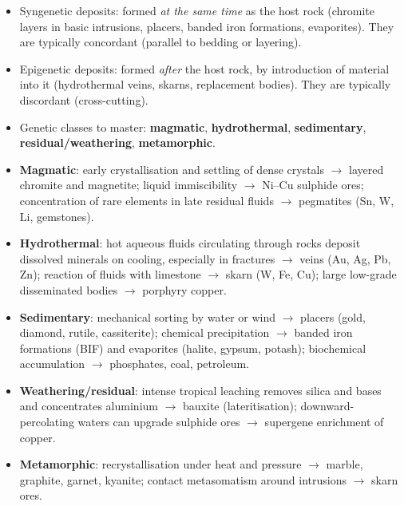 \documentclass[11pt]{article}
\newcommand{\cle}[1]{{\popxbold\color{popdark}#1}}
\begin{document}
\begin{aretenir}
\begin{itemize}
\item \cle{Syngenetic} deposits: formed \emph{at the same time} as the host rock (chromite layers in basic intrusions, placers, banded iron formations, evaporites). They are typically concordant (parallel to bedding or layering).
\item \cle{Epigenetic} deposits: formed \emph{after} the host rock, by introduction of material into it (hydrothermal veins, skarns, replacement bodies). They are typically discordant (cross-cutting).
\item Genetic classes to master: \textbf{magmatic}, \textbf{hydrothermal}, \textbf{sedimentary}, \textbf{residual/weathering}, \textbf{metamorphic}.
\end{itemize}
\end{aretenir}

\begin{aretenir}
\begin{itemize}
\item \textbf{Magmatic}: early crystallisation and settling of dense crystals $\rightarrow$ layered chromite and magnetite; liquid immiscibility $\rightarrow$ Ni--Cu sulphide ores; concentration of rare elements in late residual fluids $\rightarrow$ \cle{pegmatites} (Sn, W, Li, gemstones).
\item \textbf{Hydrothermal}: hot aqueous fluids circulating through rocks deposit dissolved minerals on cooling, especially in fractures $\rightarrow$ \cle{veins} (Au, Ag, Pb, Zn); reaction of fluids with limestone $\rightarrow$ \cle{skarn} (W, Fe, Cu); large low-grade disseminated bodies $\rightarrow$ \cle{porphyry copper}.
\item \textbf{Sedimentary}: mechanical sorting by water or wind $\rightarrow$ \cle{placers} (gold, diamond, rutile, cassiterite); chemical precipitation $\rightarrow$ \cle{banded iron formations} (BIF) and \cle{evaporites} (halite, gypsum, potash); biochemical accumulation $\rightarrow$ phosphates, coal, petroleum.
\item \textbf{Weathering/residual}: intense tropical leaching removes silica and bases and concentrates aluminium $\rightarrow$ \cle{bauxite} (lateritisation); downward-percolating waters can upgrade sulphide ores $\rightarrow$ \cle{supergene enrichment} of copper.
\item \textbf{Metamorphic}: recrystallisation under heat and pressure $\rightarrow$ marble, graphite, garnet, kyanite; contact metasomatism around intrusions $\rightarrow$ skarn ores.
\end{itemize}
\end{aretenir}
\end{document}
